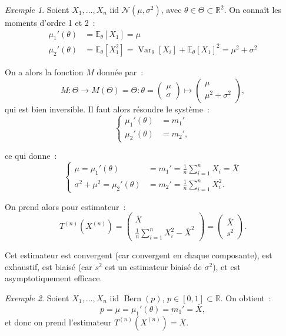 \documentclass{report}
\DeclareMathOperator{\Bern}{Bern}  %
\DeclareMathOperator{\Var}{Var}
\newcommand{\E}{\mathbb E}
\newcommand{\Nms}{\mathcal N(\mu, \sigma^2)}
\newcommand{\R}{\mathbb R}
\newcommand{\n}{{(n)}}
\newcommand{\Xn}{{X^\n}}
\newcommand{\Tn}{{T^\n}}
\newcommand{\TnXn}{{\Tn(\Xn)}}
\theoremstyle{definition}
\theoremstyle{remark}
\newtheorem{ex}{Exemple}[chapter]
\begin{document}
			\begin{ex} Soient $X_1, \ldots, X_n$ iid $\Nms$, avec $\theta \in \Theta \subset \R^2$. On connaît les moments d'ordre 1 et 2~:
			\begin{align*}
				\mu_1'(\theta) &= \E_\theta[X_1] = \mu \\
				\mu_2'(\theta) &= \E_\theta[X_1^2] = \Var_\theta[X_i] + {\E_\theta[X_1]}^2 = \mu^2 + \sigma^2
			\end{align*}

			On a alors la fonction $M$ donnée par~:
			\[M : \Theta \to M(\Theta) = \Theta : \theta = \begin{pmatrix}\mu \\ \sigma\end{pmatrix} \mapsto \begin{pmatrix}\mu \\ \mu^2 + \sigma^2\end{pmatrix},\]
			qui est bien inversible. Il faut alors résoudre le système~:
			\[\left\{\begin{aligned}
				\mu_1'(\theta) &= m_1' \\
				\mu_2'(\theta) &= m_2',
			\end{aligned}\right.\]

			ce qui donne~:
			\[\left\{\begin{aligned}
				\mu = \mu_1'(\theta) &= m_1' = \frac 1n\sum_{i=1}^nX_i = \overline X \\
				\sigma^2 + \mu^2 = \mu_2'(\theta) &= m_2' = \frac 1n\sum_{i=1}^nX_i^2.
			\end{aligned}\right.\]

			On prend alors pour estimateur~:
			\[\TnXn = \begin{pmatrix}\overline X \\\frac 1n\sum_{i=1}^nX_i^2 - {\overline X}^2\end{pmatrix} = \begin{pmatrix}\overline X \\ s^2\end{pmatrix}.\]

			Cet estimateur est convergent (car convergent en chaque composante), est exhaustif, est biaisé (car $s^2$ est un estimateur biaisé de $\sigma^2$), et est
			asymptotiquement efficace.
			\end{ex}

			\begin{ex} Soient $X_1, \ldots, X_n$ iid $\Bern(p)$, $p \in [0, 1] \subset \R$. On obtient~:
			\[p = \mu = \mu_1'(\theta) = m_1'= \overline X,\]
			et donc on prend l'estimateur $\TnXn = \overline X$.
			\end{ex}
\end{document}
